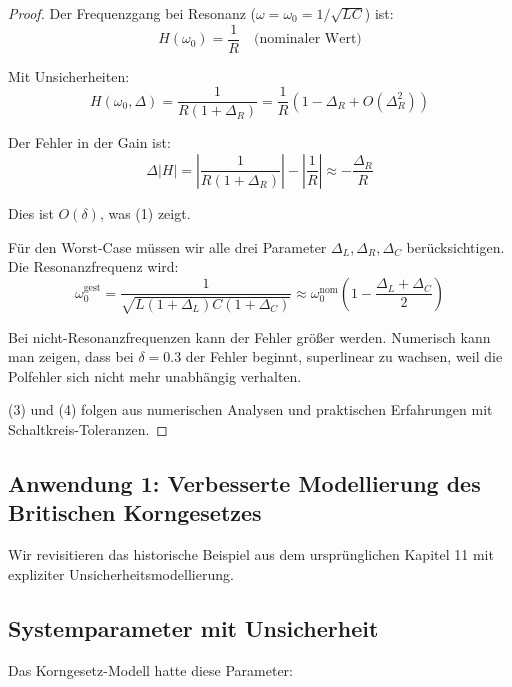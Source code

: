 \documentclass[a4paper,12pt,twoside]{report}
\theoremstyle{definition}
\begin{document}
\begin{proof}

Der Frequenzgang bei Resonanz ($\omega = \omega_0 = 1/\sqrt{LC}$) ist:
\begin{equation}
H(\omega_0) = \frac{1}{R} \quad \text{(nominaler Wert)}
\end{equation}

Mit Unsicherheiten:
\begin{equation}
H(\omega_0, \Delta) = \frac{1}{R(1+\Delta_R)} = \frac{1}{R}(1 - \Delta_R + O(\Delta_R^2))
\end{equation}

Der Fehler in der Gain ist:
\begin{equation}
\Delta |H| = \left|\frac{1}{R(1+\Delta_R)}\right| - \left|\frac{1}{R}\right| \approx -\frac{\Delta_R}{R}
\end{equation}

Dies ist $O(\delta)$, was (1) zeigt.

Für den Worst-Case müssen wir alle drei Parameter $\Delta_L, \Delta_R, \Delta_C$ berücksichtigen. Die Resonanzfrequenz wird:
\begin{equation}
\omega_0^{\text{gest}} = \frac{1}{\sqrt{L(1+\Delta_L)C(1+\Delta_C)}} \approx \omega_0^{\text{nom}} \left(1 - \frac{\Delta_L + \Delta_C}{2}\right)
\end{equation}

Bei nicht-Resonanzfrequenzen kann der Fehler größer werden. Numerisch kann man zeigen, dass bei $\delta = 0.3$ der Fehler beginnt, superlinear zu wachsen, weil die Polfehler sich nicht mehr unabhängig verhalten.

(3) und (4) folgen aus numerischen Analysen und praktischen Erfahrungen mit Schaltkreis-Toleranzen.

\end{proof}

\subsection{Anwendung 1: Verbesserte Modellierung des Britischen Korngesetzes}

Wir revisitieren das historische Beispiel aus dem ursprünglichen Kapitel 11 mit expliziter Unsicherheitsmodellierung.

\subsection{Systemparameter mit Unsicherheit}

Das Korngesetz-Modell hatte diese Parameter:
\end{document}
